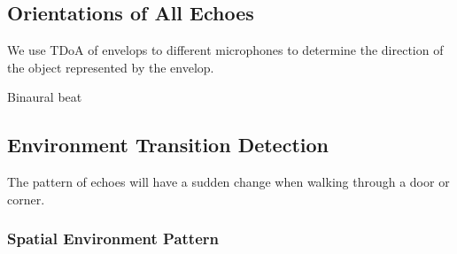

\subsection{Orientations of All Echoes}

We use TDoA of envelops to different microphones to determine the direction 
of the object represented by the envelop.


Binaural beat


\subsection{Environment Transition Detection}


The pattern of echoes will have a sudden change when walking through a door or corner.

\subsubsection{Spatial Environment Pattern}

